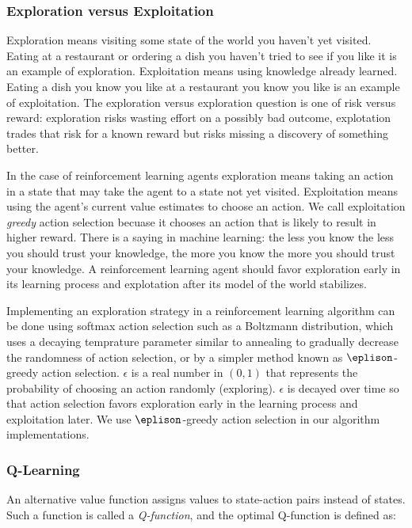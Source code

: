 \subsubsection{Exploration versus Exploitation}

Exploration means visiting some state of the world you haven't yet visited. Eating at a restaurant or ordering a dish you haven't tried to see if you like it is an example of exploration. Exploitation means using knowledge already learned. Eating a dish you know you like at a restaurant you know you like is an example of exploitation. The exploration versus exploration question is one of risk versus reward: exploration risks wasting effort on a possibly bad outcome, explotation trades that risk for a known reward but risks missing a discovery of something better.

In the case of reinforcement learning agents exploration means taking an action in a state that may take the agent to a state not yet visited. Exploitation means using the agent's current value estimates to choose an action. We call exploitation {\it greedy} action selection becuase it chooses an action that is likely to result in higher reward. There is a saying in machine learning: the less you know the less you should trust your knowledge, the more you know the more you should trust your knowledge. A reinforcement learning agent should favor exploration early in its learning process and explotation after its model of the world stabilizes.

Implementing an exploration strategy in a reinforcement learning algorithm can be done using softmax action selection such as a Boltzmann distribution, which uses a decaying temprature parameter similar to annealing to gradually decrease the randomness of action selection, or by a simpler method known as $\eplison$-greedy action selection.  $\epsilon$ is a real number in $(0, 1)$ that represents the probability of choosing an action randomly (exploring). $\epsilon$ is decayed over time so that action selection favors exploration early in the learning process and exploitation later. We use $\eplison$-greedy action selection in our algorithm implementations.

\subsubsection{Q-Learning}

An alternative value function assigns values to state-action pairs instead of states. Such a function is called a {\it Q-function}, and the optimal Q-function is defined as:

